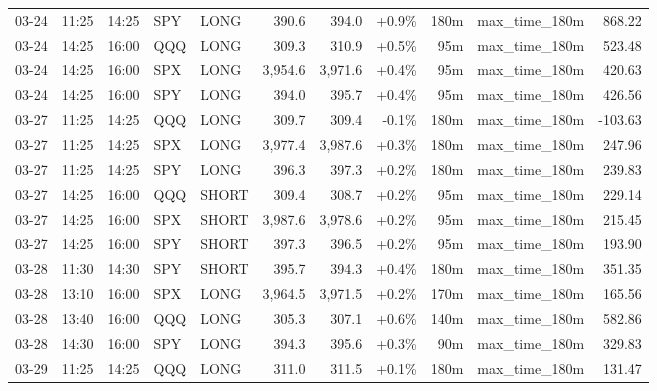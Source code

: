 \documentclass[11pt,a4paper,twoside]{article}
\begin{document}
\begin{center}
\begin{longtable}{>{\color{txtmain}}l l l l l r r r r >{\color{txtmain}}l r}
03-24 & 11:25 & 14:25 & SPY & LONG & 390.6 & 394.0 & \textcolor{wingreen}{+0.9\%} & 180m & max\_time\_180m & \textcolor{wingreen}{868.22} \\
03-24 & 14:25 & 16:00 & QQQ & LONG & 309.3 & 310.9 & \textcolor{wingreen}{+0.5\%} & 95m & max\_time\_180m & \textcolor{wingreen}{523.48} \\
03-24 & 14:25 & 16:00 & SPX & LONG & 3,954.6 & 3,971.6 & \textcolor{wingreen}{+0.4\%} & 95m & max\_time\_180m & \textcolor{wingreen}{420.63} \\
03-24 & 14:25 & 16:00 & SPY & LONG & 394.0 & 395.7 & \textcolor{wingreen}{+0.4\%} & 95m & max\_time\_180m & \textcolor{wingreen}{426.56} \\
03-27 & 11:25 & 14:25 & QQQ & LONG & 309.7 & 309.4 & \textcolor{lossred}{-0.1\%} & 180m & max\_time\_180m & \textcolor{lossred}{-103.63} \\
03-27 & 11:25 & 14:25 & SPX & LONG & 3,977.4 & 3,987.6 & \textcolor{wingreen}{+0.3\%} & 180m & max\_time\_180m & \textcolor{wingreen}{247.96} \\
03-27 & 11:25 & 14:25 & SPY & LONG & 396.3 & 397.3 & \textcolor{wingreen}{+0.2\%} & 180m & max\_time\_180m & \textcolor{wingreen}{239.83} \\
03-27 & 14:25 & 16:00 & QQQ & SHORT & 309.4 & 308.7 & \textcolor{wingreen}{+0.2\%} & 95m & max\_time\_180m & \textcolor{wingreen}{229.14} \\
03-27 & 14:25 & 16:00 & SPX & SHORT & 3,987.6 & 3,978.6 & \textcolor{wingreen}{+0.2\%} & 95m & max\_time\_180m & \textcolor{wingreen}{215.45} \\
03-27 & 14:25 & 16:00 & SPY & SHORT & 397.3 & 396.5 & \textcolor{wingreen}{+0.2\%} & 95m & max\_time\_180m & \textcolor{wingreen}{193.90} \\
03-28 & 11:30 & 14:30 & SPY & SHORT & 395.7 & 394.3 & \textcolor{wingreen}{+0.4\%} & 180m & max\_time\_180m & \textcolor{wingreen}{351.35} \\
03-28 & 13:10 & 16:00 & SPX & LONG & 3,964.5 & 3,971.5 & \textcolor{wingreen}{+0.2\%} & 170m & max\_time\_180m & \textcolor{wingreen}{165.56} \\
03-28 & 13:40 & 16:00 & QQQ & LONG & 305.3 & 307.1 & \textcolor{wingreen}{+0.6\%} & 140m & max\_time\_180m & \textcolor{wingreen}{582.86} \\
03-28 & 14:30 & 16:00 & SPY & LONG & 394.3 & 395.6 & \textcolor{wingreen}{+0.3\%} & 90m & max\_time\_180m & \textcolor{wingreen}{329.83} \\
03-29 & 11:25 & 14:25 & QQQ & LONG & 311.0 & 311.5 & \textcolor{wingreen}{+0.1\%} & 180m & max\_time\_180m & \textcolor{wingreen}{131.47} \\

\end{longtable}
\end{center}
\end{document}

